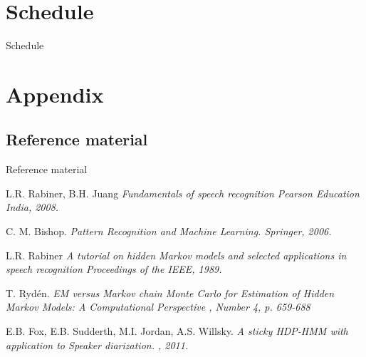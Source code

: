 \documentclass[10pt]{beamer}
\begin{document}
\section{Schedule}
\begin{frame}{Schedule}

\begin{center}

\end{center}
\end{frame}

\section{Appendix}
\subsection{Reference material}

\begin{frame}{Reference material}
  
  \footnotesize {
  \begin{thebibliography}{10}
    
  \beamertemplatebookbibitems

  {L.R. Rabiner, B.H. Juang}
    \newblock \em{Fundamentals of speech recognition}
    \newblock Pearson Education India, 2008.
  
    {C. M. Bishop.}
    \newblock \em{Pattern Recognition and Machine Learning}.
    \newblock Springer, 2006.
     
  \beamertemplatearticlebibitems
    
    {L.R. Rabiner}
    \newblock \em{A tutorial on hidden Markov models and selected 
      applications in speech recognition}
    \newblock Proceedings of the IEEE, 1989.

    {T. Rydén.}
    \newblock \em{EM versus Markov chain Monte Carlo for Estimation of Hidden 
    Markov Models: A Computational Perspective}
    , Number 4, p. 659-688
    
    {E.B. Fox, E.B. Sudderth, M.I. Jordan, A.S. Willsky.}
    \newblock \em{A sticky HDP-HMM with application to Speaker diarization}.
    , 2011.
     
  \end{thebibliography}
  }
\end{frame}
\end{document}
